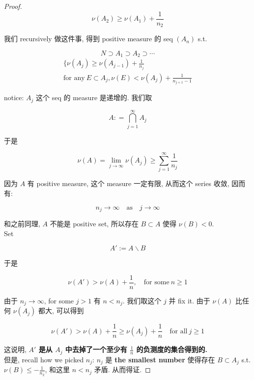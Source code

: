 \begin{proof}
\[\nu(A_{2}) \geq \nu(A_{1}) + \frac{1}{n_{2}}\]

我们 recursively 做这件事, 得到 positive measure 的 seq \((A_{n})\) s.t.

\[N \supset A_{1} \supset A_{2} \supset \cdots\]\[\begin{matrix}
{\{\nu(A_{j}) \geq \nu(A_{j - 1}) + \frac{1}{n_{j}}} \\
{\text{for any}\ E \subset A_{j},\nu(E) < \nu(A_{j}) + \frac{1}{n_{j + 1} - 1}}
\end{matrix}\]

notice: \(A_{j}\) 这个 seq 的 measure 是递增的. 我们取

\[A: = \bigcap\limits_{j = 1}^{\infty}A_{j}\]

于是

\[\nu(A) = \lim\limits_{j\rightarrow\infty}\nu(A_{j}) \geq \sum\limits_{j = 1}^{\infty}\frac{1}{n_{j}}\]

因为 \(A\) 有 positive measure, 这个 measure 一定有限, 从而这个 series 收敛, 因而有:

\[n_{j}\rightarrow\infty\quad\text{as}\quad j\rightarrow\infty\]

和之前同理, \(A\) 不能是 positive set, 所以存在 \(B \subset A\) 使得 \(\nu(B) < 0\).\\
Set

\[A' := A\backslash B\]

于是

\[\nu(A') > \nu(A) + \frac{1}{n},\quad\text{for some}\ n \geq 1\]

由于 \(n_{j}\rightarrow\infty\), for some \(j > 1\) 有 \(n < n_{j}\). 我们取这个 \(j\) 并 fix it. 由于 \(\nu(A)\) 比任何 \(\nu(A_{j})\) 都大, 可以得到

\[\nu(A') > \nu(A) + \frac{1}{n} \geq \nu(A_{j}) + \frac{1}{n}\quad\text{for all}\ j \geq 1\]

这说明, \textbf{\(A'\) 是从 \(A_{j}\) 中去掉了一个至少有 \(\frac{1}{n}\) 的负测度的集合得到的.}\\
但是, recall how we picked \(n_{j}\): \(n_{j}\) 是 \textbf{the smallest number} 使得存在 \(B \subset A_{j}\) s.t. \(\nu(B) \leq - \frac{1}{n_{2}}\), 和这里 \(n < n_{j}\) 矛盾. 从而得证.

\end{proof}

